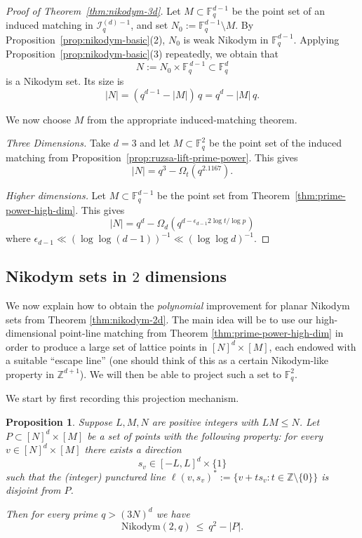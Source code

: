 \documentclass[12pt,reqno]{amsart}
\theoremstyle{plain}
\newtheorem{proposition}[theorem]{Proposition}
\theoremstyle{definition}
\newcommand{\F}{\mathbb{F}}
\newcommand{\Z}{\mathbb{Z}}
\newcommand{\Nik}{\mathrm{Nikodym}}
\newcommand{\II}{\mathcal{I}}
\newcommand{\1}{\mathbf{1}}
\begin{document}
\begin{proof}[Proof of Theorem~\ref{thm:nikodym-3d}]
Let $M\subset \F_q^{d - 1}$ be the point set of an induced matching in $\II_q^{(d) - 1}$, 
and set $N_0:=\F_q^{d - 1}\setminus M$.
By Proposition~\ref{prop:nikodym-basic}(2), $N_0$ is weak Nikodym in $\F_q^{d - 1}$.
Applying Proposition~\ref{prop:nikodym-basic}(3) repeatedly, we obtain that
\[
  N:=N_0\times \F_q^{\,d-1}\subset \F_q^d
\]
is a Nikodym set. Its size is
\[
  |N| = (q^{d - 1}-|M|)\,q = q^d - |M|\,q.
\]

We now choose $M$ from the appropriate induced-matching theorem.

\smallskip
\noindent\emph{Three Dimensions.}  Take $d=3$ and let $M\subset\F_q^2$ be the point set of the induced matching from Proposition~\ref{prop:ruzsa-lift-prime-power}. This gives
$$|N| = q^3 - \Omega_t(q^{2.1167}).$$

\smallskip

\smallskip
\noindent\emph{Higher dimensions.}  Let $M\subset\F_q^{d - 1}$ be the point set from Theorem~\ref{thm:prime-power-high-dim}.
This gives
$$|N| = q^d - \Omega_d\left(q^{d - \epsilon_{d - 1}  2 \log t / \log p}\right)$$
where $\epsilon_{d - 1} \ll (\log\log (d-1))^{-1} \ll (\log\log d)^{-1}$.
\end{proof}

\subsection{Nikodym sets in $2$ dimensions}

We now explain how to obtain the \emph{polynomial} improvement for planar Nikodym sets from Theorem \ref{thm:nikodym-2d}. The main idea will be to use our high-dimensional point-line matching from Theorem \ref{thm:prime-power-high-dim} in order to produce a large set of lattice points in $[N]^{d} \times [M]$, each endowed with a suitable ``escape line'' (one should think of this as a certain Nikodym-like property in $\Z^{d+1}$). We will then be able to project such a set to $\F_{q}^{2}$. 

We start by first recording this projection mechanism.

\begin{proposition}\label{prp:higher dim to 2d}
Suppose $L,M,N$ are positive integers with $LM\le N$.
Let $P\subset [N]^d\times [M]$ be a set of points with the following property:
for every $v\in [N]^d\times [M]$ there exists a direction
\[
  s_v\in [-L,L]^d\times\{1\} 
\]
such that the (integer) punctured line $\ell(v,s_v)^\ast:=\{v+t s_v:t\in\Z\setminus\{0\}\}$ is disjoint from $P$.

Then for every prime $q>(3N)^d$ we have
\[
  \Nik(2,q)\ \le\ q^2-|P|.
\]
\end{proposition}
\end{document}
